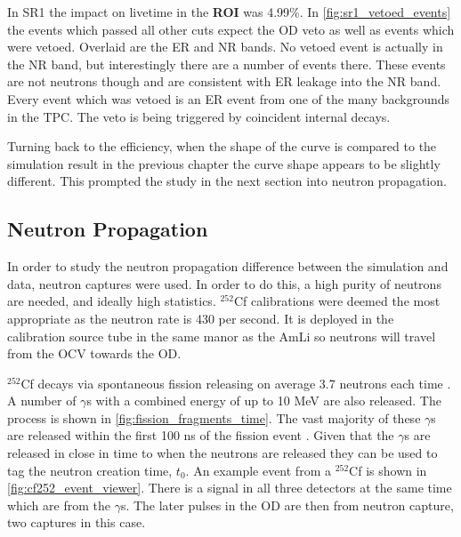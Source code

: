 \par
In SR1 the impact on livetime in the \textbf{ROI} was 4.99\%.
In \autoref{fig:sr1_vetoed_events} the events which passed all other cuts expect the OD veto as well as events which were vetoed.
Overlaid are the ER and NR bands.
No vetoed event is actually in the NR band, but interestingly there are a number of events there.
These events are not neutrons though and are consistent with ER leakage into the NR band.
Every event which was vetoed is an ER event from one of the many backgrounds in the TPC.
The veto is being triggered by coincident internal decays.



\par
Turning back to the efficiency, when the shape of the curve is compared to the simulation result in the previous chapter the curve shape appears to be slightly different.
This prompted the study in the next section into neutron propagation.

\subsection{Neutron Propagation}
\par
In order to study the neutron propagation difference between the simulation and data, neutron captures were used.
In order to do this, a high purity of neutrons are needed, and ideally high statistics.
${}^{252}$Cf calibrations were deemed the most appropriate as the neutron rate is 430 per second.
It is deployed in the calibration source tube in the same manor as the AmLi so neutrons will travel from the OCV towards the OD.
\par
${}^{252}$Cf decays via spontaneous fission releasing on average 3.7 neutrons each time \cite{californium252_ref}.
A number of $\gamma$s with a combined energy of up to 10 MeV are also released.
The process is shown in \autoref{fig:fission_fragments_time}.
The vast majority of these $\gamma$s are released within the first 100 ns of the fission event \cite{cf252_fission_ref,californium_spectra_ref}.
Given that the $\gamma$s are released in close in time to when the neutrons are released they can be used to tag the neutron creation time, $t_0$.
An example event from a ${}^{252}$Cf is shown in \autoref{fig:cf252_event_viewer}.
There is a signal in all three detectors at the same time which are from the $\gamma$s.
The later pulses in the OD are then from neutron capture, two captures in this case.

